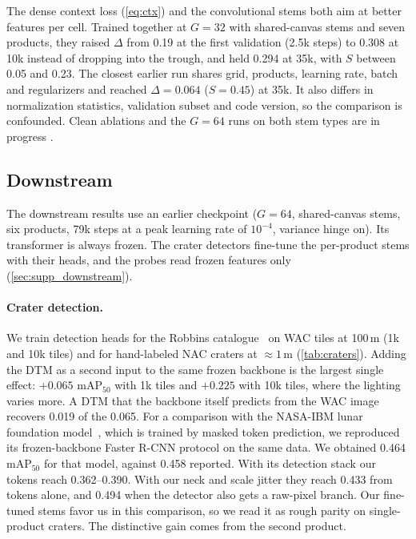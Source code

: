 The dense context loss (\cref{eq:ctx}) and the convolutional stems both aim at better features per cell. Trained together at $G{=}32$ with shared-canvas stems and seven products, they raised $\Delta$ from 0.19 at the first validation (2.5k steps) to 0.308 at 10k instead of dropping into the trough, and held 0.294 at 35k, with $S$ between 0.05 and 0.23. The closest earlier run shares grid, products, learning rate, batch and regularizers and reached $\Delta{=}0.064$ ($S{=}0.45$) at 35k. It also differs in normalization statistics, validation subset and code version, so the comparison is confounded. Clean ablations and the $G{=}64$ runs on both stem types are in progress .

\subsection{Downstream}
\label{sec:downstream}

The downstream results use an earlier checkpoint ($G{=}64$, shared-canvas stems, six products, 79k steps at a peak learning rate of $10^{-4}$, variance hinge on). Its transformer is always frozen. The crater detectors fine-tune the per-product stems with their heads, and the probes read frozen features only (\cref{sec:supp_downstream}).

\paragraph{Crater detection.} We train detection heads for the Robbins catalogue~\cite{robbins2019new} on WAC tiles at 100\,m (1k and 10k tiles) and for hand-labeled NAC craters at ${\approx}1$\,m (\cref{tab:craters}). Adding the DTM as a second input to the same frozen backbone is the largest single effect: $+0.065$ mAP$_{50}$ with 1k tiles and $+0.225$ with 10k tiles, where the lighting varies more. A DTM that the backbone itself predicts from the WAC image recovers 0.019 of the 0.065. For a comparison with the NASA-IBM lunar foundation model~\cite{fraccaro2026multimodal}, which is trained by masked token prediction, we reproduced its frozen-backbone Faster R-CNN protocol on the same data. We obtained 0.464 mAP$_{50}$ for that model, against 0.458 reported. With its detection stack our tokens reach 0.362--0.390. With our neck and scale jitter they reach 0.433 from tokens alone, and 0.494 when the detector also gets a raw-pixel branch. Our fine-tuned stems favor us in this comparison, so we read it as rough parity on single-product craters. The distinctive gain comes from the second product.

